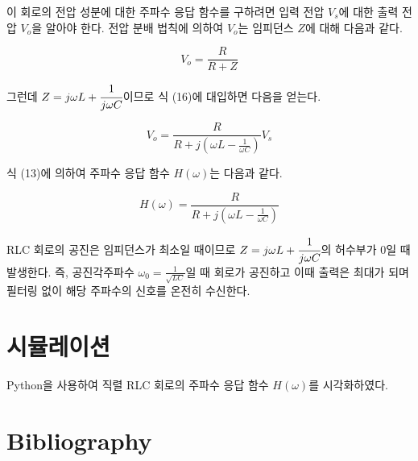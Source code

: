 \documentclass{article}
\begin{document}
이 회로의 전압 성분에 대한 주파수 응답 함수를 구하려면 입력 전압 $V_s$에 대한 출력 전압 $V_o$을 알아야 한다. 전압 분배 법칙에 의하여 $V_o$는 임피던스 $Z$에 대해 다음과 같다.

\begin{equation}
    V_o=\frac{R}{R+Z}
\end{equation}

그런데 $Z=j\omega L+\cfrac{1}{j\omega C}$이므로 식 (16)에 대입하면 다음을 얻는다.

\begin{equation}
    V_o=\frac{R}{R+j(\omega L-\frac{1}{\omega C})}V_s
\end{equation}

식 (13)에 의하여 주파수 응답 함수 $H(\omega)$는 다음과 같다.

\begin{equation}
    H(\omega)=\frac{R}{R+j(\omega L-\frac{1}{\omega C})}
\end{equation}

RLC 회로의 공진은 임피던스가 최소일 때이므로 $Z=j\omega L+\cfrac{1}{j\omega C}$의 허수부가 0일 때 발생한다. 즉, 공진각주파수 $\omega_0=\frac{1}{\sqrt{LC}}$일 때 회로가 공진하고 이때 출력은 최대가 되며 필터링 없이 해당 주파수의 신호를 온전히 수신한다.

\section{시뮬레이션}
Python을 사용하여 직렬 RLC 회로의 주파수 응답 함수 $H(\omega)$를 시각화하였다.

\section{Bibliography}
\end{document}
